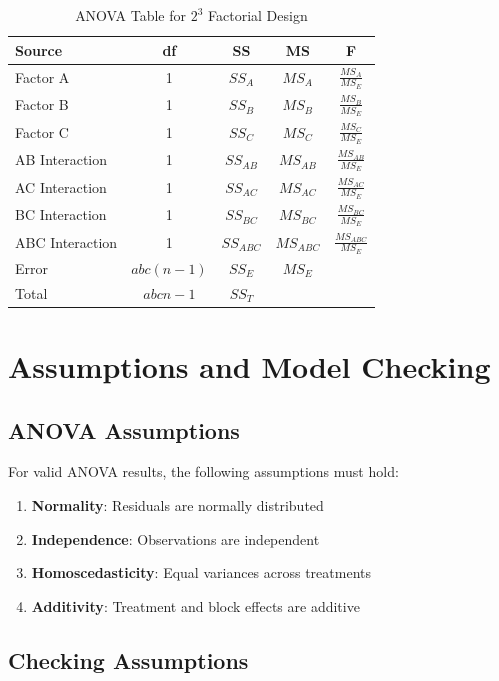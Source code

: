 \documentclass[twoside]{book}
\begin{document}
\begin{table}[h]
\centering
\caption{ANOVA Table for $2^3$ Factorial Design}
\begin{tabular}{|l|c|c|c|c|}
\hline
\textbf{Source} & \textbf{df} & \textbf{SS} & \textbf{MS} & \textbf{F} \\
\hline
Factor A & 1 & $SS_A$ & $MS_A$ & $\frac{MS_A}{MS_E}$ \\
Factor B & 1 & $SS_B$ & $MS_B$ & $\frac{MS_B}{MS_E}$ \\
Factor C & 1 & $SS_C$ & $MS_C$ & $\frac{MS_C}{MS_E}$ \\
AB Interaction & 1 & $SS_{AB}$ & $MS_{AB}$ & $\frac{MS_{AB}}{MS_E}$ \\
AC Interaction & 1 & $SS_{AC}$ & $MS_{AC}$ & $\frac{MS_{AC}}{MS_E}$ \\
BC Interaction & 1 & $SS_{BC}$ & $MS_{BC}$ & $\frac{MS_{BC}}{MS_E}$ \\
ABC Interaction & 1 & $SS_{ABC}$ & $MS_{ABC}$ & $\frac{MS_{ABC}}{MS_E}$ \\
Error & $abc(n-1)$ & $SS_E$ & $MS_E$ & \\
\hline
Total & $abcn-1$ & $SS_T$ & & \\
\hline
\end{tabular}
\end{table}

\section{Assumptions and Model Checking}

\subsection{ANOVA Assumptions}

For valid ANOVA results, the following assumptions must hold:

\begin{enumerate}
    \item \textbf{Normality}: Residuals are normally distributed
    \item \textbf{Independence}: Observations are independent
    \item \textbf{Homoscedasticity}: Equal variances across treatments
    \item \textbf{Additivity}: Treatment and block effects are additive
\end{enumerate}

\subsection{Checking Assumptions}
\end{document}
